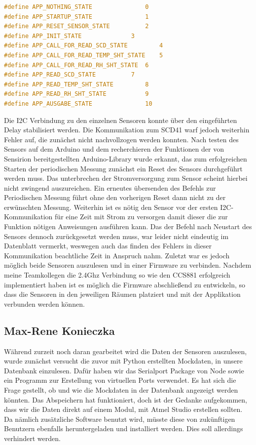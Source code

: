 \documentclass[]{article}
\begin{document}
\begin{lstlisting}[language=C,frame=single, caption = APPSTATE definitions , label = appstate_define] 
#define APP_NOTHING_STATE				0
#define APP_STARTUP_STATE 				1
#define APP_RESET_SENSOR_STATE 			2
#define APP_INIT_STATE 				3
#define APP_CALL_FOR_READ_SCD_STATE 		4
#define APP_CALL_FOR_READ_TEMP_SHT_STATE 	5
#define APP_CALL_FOR_READ_RH_SHT_STATE 	6
#define APP_READ_SCD_STATE 			7
#define APP_READ_TEMP_SHT_STATE 		8
#define APP_READ_RH_SHT_STATE 			9
#define APP_AUSGABE_STATE 				10
\end{lstlisting} 

Die I2C Verbindung zu den einzelnen Sensoren konnte über den eingeführten Delay stabilisiert werden.
Die Kommunikation zum SCD41 warf jedoch weiterhin Fehler auf, die zunächst nicht nachvollzogen werden konnten. Nach testen des Sensors auf dem Arduino und dem recherchieren der Funktionen der von Sensirion bereitgestellten Arduino-Library wurde erkannt, das zum erfolgreichen Starten der periodischen Messung zunächst ein Reset des Sensors durchgeführt werden muss. Das unterbrechen der Stromversorgung zum Sensor scheint hierbei nicht zwingend auszureichen. Ein erneutes übersenden des Befehls zur Periodischen Messung führt ohne den vorherigen Reset dann nicht zu der erwünschten Messung. Weiterhin ist es nötig den Sensor vor der ersten I2C-Kommunikation für eine Zeit mit Strom zu versorgen damit dieser die zur Funktion nötigen Anweisungen ausführen kann. Das der Befehl nach Neustart des Sensors dennoch zurückgesetzt werden muss, war leider nicht eindeutig im Datenblatt vermerkt, weswegen auch das finden des Fehlers in dieser Kommunikation beachtliche Zeit in Anspruch nahm.
Zuletzt war es jedoch möglich beide Sensoren auszulesen und in einer Firmware zu verbinden. Nachdem meine Teamkollegen die 2.4Ghz Verbindung so wie den CCS881 erfolgreich implementiert haben ist es möglich die Firmware abschließend zu entwickeln, so dass die Sensoren in den jeweiligen Räumen platziert und mit der Applikation verbunden werden können. 



\subsection{Max-Rene Konieczka}
Während zurzeit noch daran gearbeitet wird die Daten der Sensoren auszulesen, wurde zunächst versucht die zuvor mit Python erstellten Mockdaten, in unsere Datenbank einzulesen. Dafür haben wir das Serialport Package von Node sowie ein Programm zur Erstellung von virtuellen Ports verwendet. Es hat sich die Frage gestellt, ob und wie die Mockdaten in der Datenbank angezeigt werden könnten. Das Abspeichern hat funktioniert, doch ist der Gedanke aufgekommen, dass wir die Daten direkt auf einem Modul, mit Atmel Studio erstellen sollten. Da nämlich zusätzliche Software benutzt wird, müsste diese von zukünftigen Benutzern ebenfalls heruntergeladen und installiert werden. Dies soll allerdings verhindert werden.
\end{document}
